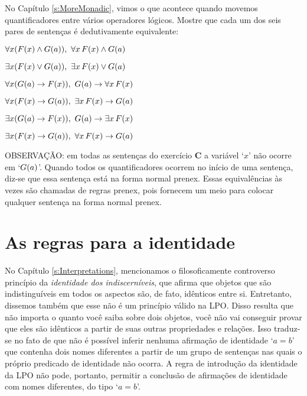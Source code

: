 \problempart
No Capítulo \ref{s:MoreMonadic}, vimos o que acontece quando movemos quantificadores entre  vários operadores lógicos. Mostre que cada um dos seis pares de sentenças é dedutivamente equivalente:
\begin{earg}
\item $\forall x(\mathord{F}(x) \wedge \mathord{G}(a)),\,\,  \forall x\,\mathord{F}(x) \wedge \mathord{G}(a)$
\item $\exists x(\mathord{F}(x) \vee \mathord{G}(a)),\,\,  \exists x\,\mathord{F}(x) \vee \mathord{G}(a)$
\item $\forall x(\mathord{G}(a) \rightarrow \mathord{F}(x)),\,\,  \mathord{G}(a) \rightarrow \forall x\,\mathord{F}(x)$
\item $\forall x(\mathord{F}(x) \rightarrow \mathord{G}(a)),\,\,  \exists x\,\mathord{F}(x) \rightarrow \mathord{G}(a)$
\item $\exists x(\mathord{G}(a) \rightarrow \mathord{F}(x)),\,\,  \mathord{G}(a) \rightarrow \exists x\,\mathord{F}(x)$
\item $\exists x(\mathord{F}(x) \rightarrow \mathord{G}(a)),\,\,  \forall x\,\mathord{F}(x) \rightarrow \mathord{G}(a)$
\end{earg}
OBSERVAÇÃO: em todas as sentenças do exercício \textbf{C} a variável `$x$' não ocorre em `$\mathord{G}(a)$'.
Quando todos os quantificadores ocorrem no início de uma sentença, diz-se que essa sentença está na forma normal prenex. Essas equivalências às vezes são chamadas de regras prenex, pois fornecem um meio para colocar qualquer sentença na forma normal prenex.


 

\chapter{As regras para a identidade}

No Capítulo  \ref{s:Interpretations}, mencionamos o filosoficamente controverso   princípio da \emph{identidade dos indiscerníveis}, que afirma que objetos que são indistinguíveis em todos os aspectos são, de fato, idênticos entre si. Entretanto, dissemos também que esse não é um princípio válido na LPO.  Disso resulta que não importa o quanto você saiba sobre dois objetos, você não vai conseguir provar que eles são idênticos a partir de suas outras propriedades e relações. Isso traduz-se no fato de que não é possível inferir nenhuma afirmação de identidade `$a=b$' que contenha dois nomes diferentes a partir de um grupo de sentenças nas quais o próprio predicado de identidade não ocorra. A regra de introdução da identidade da LPO não pode, portanto, permitir a conclusão de afirmações de identidade com nomes diferentes, do tipo `$a=b$'.

